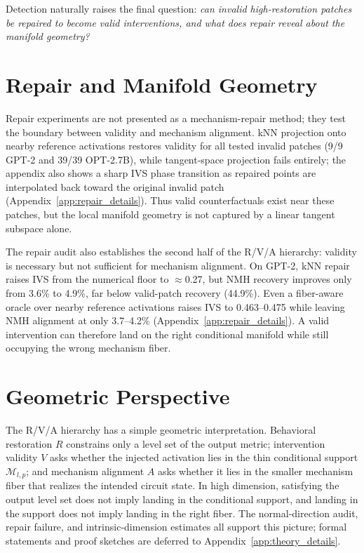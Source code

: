 \documentclass{article}
\newcommand{\manifold}{\mathcal{M}}
\begin{document}
Detection naturally raises the final question: \emph{can invalid high-restoration patches be repaired to become valid interventions, and what does repair reveal about the manifold geometry?}

\section{Repair and Manifold Geometry}
\label{sec:repair_sec}

Repair experiments are not presented as a mechanism-repair method; they test the boundary between validity and mechanism alignment. kNN projection onto nearby reference activations restores validity for all tested invalid patches (9/9 GPT-2 and 39/39 OPT-2.7B), while tangent-space projection fails entirely; the appendix also shows a sharp IVS phase transition as repaired points are interpolated back toward the original invalid patch (Appendix~\ref{app:repair_details}). Thus valid counterfactuals exist near these patches, but the local manifold geometry is not captured by a linear tangent subspace alone.

The repair audit also establishes the second half of the R/V/A hierarchy: validity is necessary but not sufficient for mechanism alignment. On GPT-2, kNN repair raises IVS from the numerical floor to $\approx$0.27, but NMH recovery improves only from 3.6\% to 4.9\%, far below valid-patch recovery (44.9\%). Even a fiber-aware oracle over nearby reference activations raises IVS to 0.463--0.475 while leaving NMH alignment at only 3.7--4.2\% (Appendix~\ref{app:repair_details}). A valid intervention can therefore land on the right conditional manifold while still occupying the wrong mechanism fiber.

\section{Geometric Perspective}
\label{sec:theory}

The R/V/A hierarchy has a simple geometric interpretation. Behavioral restoration $R$ constrains only a level set of the output metric; intervention validity $V$ asks whether the injected activation lies in the thin conditional support $\manifold_{l,p}$; and mechanism alignment $A$ asks whether it lies in the smaller mechanism fiber that realizes the intended circuit state. In high dimension, satisfying the output level set does not imply landing in the conditional support, and landing in the support does not imply landing in the right fiber. The normal-direction audit, repair failure, and intrinsic-dimension estimates all support this picture; formal statements and proof sketches are deferred to Appendix~\ref{app:theory_details}.
\end{document}
